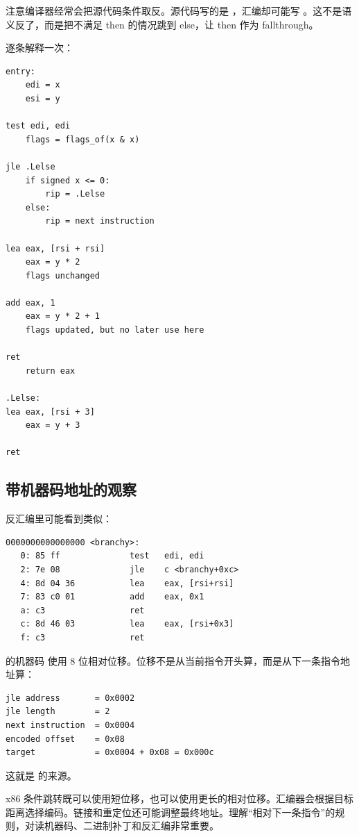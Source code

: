 注意编译器经常会把源代码条件取反。源代码写的是 ，汇编却可能写 。这不是语义反了，而是把不满足 then 的情况跳到 else，让 then 作为 fallthrough。

逐条解释一次：

\begin{lstlisting}
entry:
    edi = x
    esi = y

test edi, edi
    flags = flags_of(x & x)

jle .Lelse
    if signed x <= 0:
        rip = .Lelse
    else:
        rip = next instruction

lea eax, [rsi + rsi]
    eax = y * 2
    flags unchanged

add eax, 1
    eax = y * 2 + 1
    flags updated, but no later use here

ret
    return eax

.Lelse:
lea eax, [rsi + 3]
    eax = y + 3

ret
\end{lstlisting}

\subsection{带机器码地址的观察}

反汇编里可能看到类似：

\begin{lstlisting}
0000000000000000 <branchy>:
   0: 85 ff              test   edi, edi
   2: 7e 08              jle    c <branchy+0xc>
   4: 8d 04 36           lea    eax, [rsi+rsi]
   7: 83 c0 01           add    eax, 0x1
   a: c3                 ret
   c: 8d 46 03           lea    eax, [rsi+0x3]
   f: c3                 ret
\end{lstlisting}

 的机器码  使用 8 位相对位移。位移不是从当前指令开头算，而是从下一条指令地址算：

\begin{lstlisting}
jle address       = 0x0002
jle length        = 2
next instruction  = 0x0004
encoded offset    = 0x08
target            = 0x0004 + 0x08 = 0x000c
\end{lstlisting}

这就是  的来源。

\begin{deepdive}
x86 条件跳转既可以使用短位移，也可以使用更长的相对位移。汇编器会根据目标距离选择编码。链接和重定位还可能调整最终地址。理解“相对下一条指令”的规则，对读机器码、二进制补丁和反汇编非常重要。
\end{deepdive}

